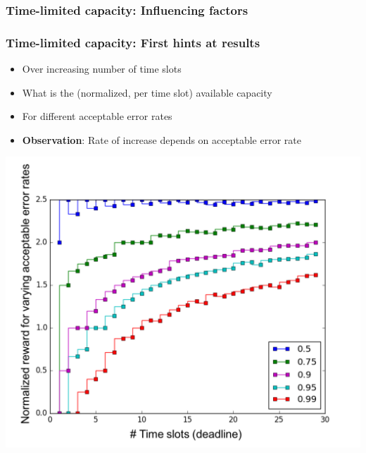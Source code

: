 \begin{frame}
  \frametitle{Time-limited capacity: Influencing factors}
  \begin{center}
  \end{center}
\end{frame}

\begin{frame}
  \frametitle{Time-limited capacity: First hints at results}
  \begin{itemize}
    
  \item Over increasing number of time slots 
  \item What is the (normalized, per time slot) available capacity
  \item For different acceptable error rates 
  \item \textbf{Observation}: Rate of increase depends on acceptable error rate 
  \end{itemize}
  
  \begin{center}
    \includegraphics[width=0.6\columnwidth]{rewards-correlated}
  \end{center}

\end{frame}



